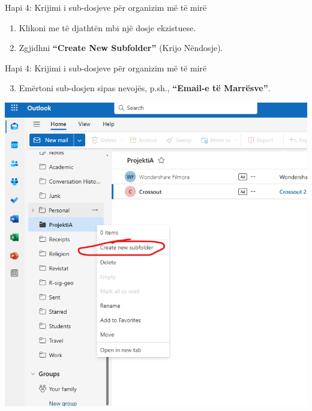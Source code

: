 \documentclass[
  ignorenonframetext,
]{beamer}
\providecommand{\tightlist}{%
  \setlength{\itemsep}{0pt}\setlength{\parskip}{0pt}}
\begin{document}
\begin{frame}{Hapi 4: Krijimi i sub-dosjeve për organizim më të mirë}
\label{hapi-4-krijimi-i-sub-dosjeve-puxebr-organizim-muxeb-tuxeb-miruxeb}
\begin{enumerate}
\item
  Klikoni me të djathtën mbi një dosje ekzistuese.
\item
  Zgjidhni \textbf{``Create New Subfolder''} (Krijo Nëndosje).
\end{enumerate}
\end{frame}

\begin{frame}{Hapi 4: Krijimi i sub-dosjeve për organizim më të mirë}
\label{hapi-4-krijimi-i-sub-dosjeve-puxebr-organizim-muxeb-tuxeb-miruxeb-1}
\begin{enumerate}
\setcounter{enumi}{2}
\tightlist
\item
  Emërtoni sub-dosjen sipas nevojës, p.sh., \textbf{``Email-e të
  Marrësve''}.
\end{enumerate}

\includegraphics{./images/outlook15.png}
\end{frame}
\end{document}
